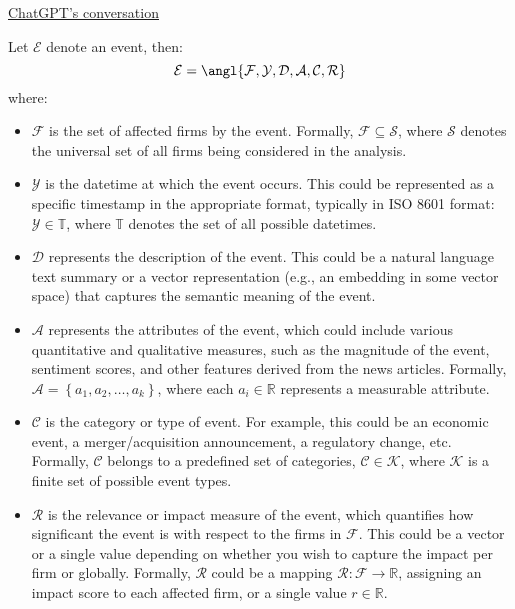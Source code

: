 \documentclass[12pt,article]{memoir}
\begin{document}
\href{https://chatgpt.com/share/7bdd6993-9528-4892-9208-7a2f32a49439}{ChatGPT's conversation}

Let $\mathcal{E}$ denote an event, then: 
$$
\mathcal{E}=\angl{\mathcal{F}, \mathcal{Y}, \mathcal{D}, \mathcal{A}, \mathcal{C}, \mathcal{R}}
$$
where:
\begin{itemize}
  \item 
  $\mathcal{F}$ is the set of affected firms by the event. Formally, $\mathcal{F} \subseteq \mathcal{S}$, where $\mathcal{S}$ denotes the universal set of all firms being considered in the analysis.
  \item $\mathcal{Y}$ is the datetime at which the event occurs. This could be represented as a specific timestamp in the appropriate format, typically in ISO 8601 format: $\mathcal{Y} \in \mathbb{T}$, where $\mathbb{T}$ denotes the set of all possible datetimes.
  \item $\mathcal{D}$ represents the description of the event. This could be a natural language text summary or a vector representation (e.g., an embedding in some vector space) that captures the semantic meaning of the event.
  \item $\mathcal{A}$ represents the attributes of the event, which could include various quantitative and qualitative measures, such as the magnitude of the event, sentiment scores, and other features derived from the news articles. Formally, $\mathcal{A}=\left\{a_1, a_2, \ldots, a_k\right\}$, where each $a_i \in \mathbb{R}$ represents a measurable attribute.
  \item $\mathcal{C}$ is the category or type of event. For example, this could be an economic event, a merger/acquisition announcement, a regulatory change, etc. Formally, $\mathcal{C}$ belongs to a predefined set of categories, $\mathcal{C} \in \mathcal{K}$, where $\mathcal{K}$ is a finite set of possible event types.
  \item $\mathcal{R}$ is the relevance or impact measure of the event, which quantifies how significant the event is with respect to the firms in $\mathcal{F}$. This could be a vector or a single value depending on whether you wish to capture the impact per firm or globally. Formally, $\mathcal{R}$ could be a mapping $\mathcal{R}: \mathcal{F} \rightarrow \mathbb{R}$, assigning an impact score to each affected firm, or a single value $r \in \mathbb{R}$.
\end{itemize}
\end{document}
